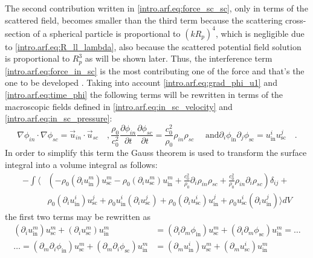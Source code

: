 The second contribution written in \eqref{intro.arf.eq:force_sc_sc}, only in terms of the scattered field, becomes smaller than the third term because the scattering cross-section of a spherical particle is proportional to $(kR_p)^4$, which is negligible due to \eqref{intro.arf.eq:R_ll_lambda}, also because the scattered potential field solution is proportional to $R_p^3$ as will be shown later. Thus, the interference term \eqref{intro.arf.eq:force_in_sc} is the most contributing one of the force and that's the one to be developed \cite[~p.79]{Manneberg2009}. Taking into account \eqref{intro.arf.eq:grad_phi_u1} and \eqref{intro.arf.eq:time_phi} the following terms will be rewritten in terms of the macroscopic fields defined in \eqref{intro.arf.eq:in_sc_velocity} and \eqref{intro.arf.eq:in_sc_pressure}:
\begin{subequations}\label{intro.arf.eq:phi_fields}
\begin{equation}\label{intro.arf.eq:force_grad_vel}
    \nabla\phi_{in}\cdot\nabla\phi_{sc} = \vec u_{in}\cdot\vec u_{sc}\quad,
\end{equation}    
\begin{equation}\label{intro.arf.eq:force_phi_rho}
    \frac{\rho_0}{c_0^2}\frac{\partial\phi_{in}}{\partial t}\frac{\partial\phi_{sc}}{\partial t} = \frac{c_0^2}{\rho_0}\rho_{in}\rho_{sc}\quad\text{ and}
\end{equation}    
\begin{equation}
    \partial_i\phi_{\text{in}}\partial_j\phi_{\text{sc}} = u_{\text{in}}^{i}u_{\text{sc}}^{j}\quad.
\end{equation}
\end{subequations}
In order to simplify this term the Gauss theorem is used to transform the surface integral into a volume integral as follows: 
\begin{align}\label{intro.arf.eq:force_in_sc_gauss}
    -\int\bigg\langle&\left(-\rho_0(\partial_iu_{\text{in}}^{m})u_{\text{sc}}^{m} - \rho_0 (\partial_iu_{\text{sc}}^{m})u_{\text{in}}^{m} + \frac{c_0^2}{\rho_0}\partial_i\rho_{in}\rho_{sc} + \frac{c_0^2}{\rho_0}\rho_{in}\partial_i\rho_{sc}\right)\delta_{ij} + \nonumber\\
    &\rho_0(\partial_{i}u_{\text{in}}^{i})u_{\text{sc}}^{j} + \rho_0u_{\text{in}}^{i}(\partial_{i}u_{\text{sc}}^{j}) + \rho_0(\partial_{i}u_{\text{sc}}^{i})u_{\text{in}}^{j} + \rho_0u_{\text{sc}}^{i}(\partial_{i}u_{\text{in}}^{j})\bigg\rangle dV
\end{align}
the first two terms may be rewritten as
\begin{align}
    (\partial_iu_{\text{in}}^{m})u_{\text{sc}}^{m} + (\partial_iu_{\text{sc}}^{m})u_{\text{in}}^{m} &= (\partial_i\partial_m\phi_{\text{in}})u_{\text{sc}}^{m} + (\partial_i\partial_m\phi_{\text{sc}})u_{\text{in}}^{m} = \dots\nonumber\\
    \dots=(\partial_m\partial_i\phi_{\text{in}})u_{\text{sc}}^{m} + (\partial_m\partial_i\phi_{\text{sc}})u_{\text{in}}^{m} &= (\partial_mu_{\text{in}}^{i})u_{\text{sc}}^{m} + (\partial_mu_{\text{sc}}^{i})u_{\text{in}}^{m}
\end{align}

